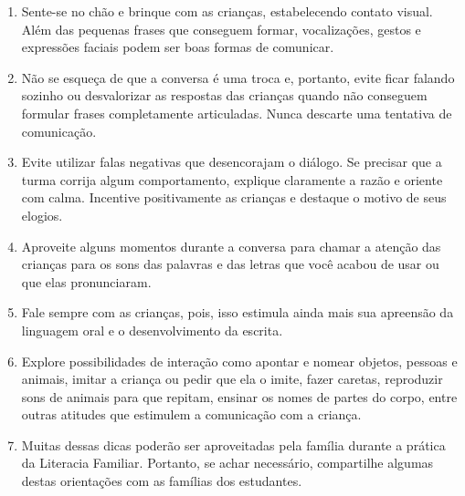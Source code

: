 \documentclass[11pt]{extarticle}
\begin{document}
\begin{enumerate}
\item Sente-se no chão e brinque com as crianças, estabelecendo 
contato visual. Além das pequenas frases que conseguem formar, vocalizações, 
gestos e expressões faciais podem ser boas formas de comunicar.

\item Não se esqueça de que a conversa é uma troca e, portanto, 
evite ficar falando sozinho ou desvalorizar as respostas das 
crianças quando não conseguem formular frases completamente articuladas. 
Nunca descarte uma tentativa de comunicação. 

\item Evite utilizar falas negativas que desencorajam o diálogo. 
Se precisar que a turma 
corrija algum comportamento, explique claramente a razão e 
oriente com calma. Incentive positivamente as crianças e 
destaque o motivo de seus elogios. 


\item Aproveite alguns momentos durante a conversa para chamar 
a atenção das crianças para os sons das palavras e das letras que você 
acabou de usar ou que elas pronunciaram.  

\item Fale sempre com as crianças, pois, isso estimula ainda mais sua apreensão da linguagem oral e o desenvolvimento da escrita.

\item Explore possibilidades de interação como apontar e 
nomear objetos, pessoas e animais, imitar a criança ou pedir que 
ela o imite, fazer caretas, reproduzir sons de 
animais para que repitam, ensinar os nomes de partes do corpo, 
entre outras atitudes que estimulem a comunicação com a criança. 

\item Muitas dessas dicas poderão ser aproveitadas pela 
família durante a prática da Literacia Familiar. Portanto, 
se achar necessário, compartilhe algumas destas orientações 
com as famílias dos estudantes.
\end{enumerate}
\end{document}
